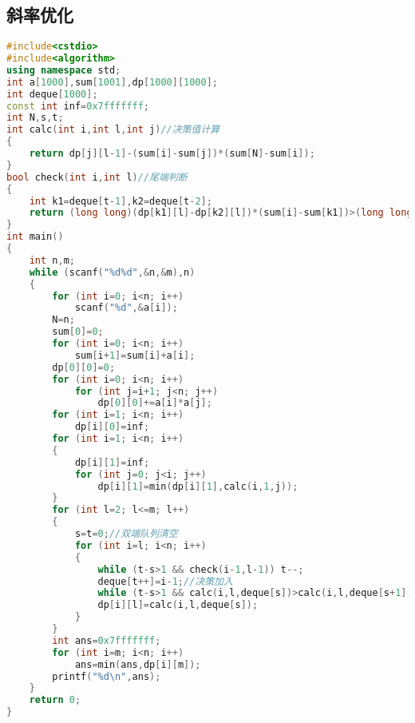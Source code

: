 \subsection{斜率优化}
	\begin{lstlisting}[language=c++]
#include<cstdio>
#include<algorithm>
using namespace std;
int a[1000],sum[1001],dp[1000][1000];
int deque[1000];
const int inf=0x7fffffff;
int N,s,t;
int calc(int i,int l,int j)//决策值计算
{
	return dp[j][l-1]-(sum[i]-sum[j])*(sum[N]-sum[i]);
}
bool check(int i,int l)//尾端判断
{
	int k1=deque[t-1],k2=deque[t-2];
	return (long long)(dp[k1][l]-dp[k2][l])*(sum[i]-sum[k1])>(long long)(dp[i][l]-dp[k1][l])*(sum[k1]-sum[k2]);
}
int main()
{
	int n,m;
	while (scanf("%d%d",&n,&m),n)
	{
		for (int i=0; i<n; i++)
			scanf("%d",&a[i]);
		N=n;
		sum[0]=0;
		for (int i=0; i<n; i++)
			sum[i+1]=sum[i]+a[i];
		dp[0][0]=0;
		for (int i=0; i<n; i++)
			for (int j=i+1; j<n; j++)
				dp[0][0]+=a[i]*a[j];
		for (int i=1; i<n; i++)
			dp[i][0]=inf;
		for (int i=1; i<n; i++)
		{
			dp[i][1]=inf;
			for (int j=0; j<i; j++)
				dp[i][1]=min(dp[i][1],calc(i,1,j));
		}
		for (int l=2; l<=m; l++)
		{
			s=t=0;//双端队列清空
			for (int i=l; i<n; i++)
			{
				while (t-s>1 && check(i-1,l-1)) t--;
				deque[t++]=i-1;//决策加入
				while (t-s>1 && calc(i,l,deque[s])>calc(i,l,deque[s+1])) s++;
				dp[i][l]=calc(i,l,deque[s]);
			}
		}
		int ans=0x7fffffff;
		for (int i=m; i<n; i++)
			ans=min(ans,dp[i][m]);
		printf("%d\n",ans);
	}
	return 0;
}
	\end{lstlisting}
